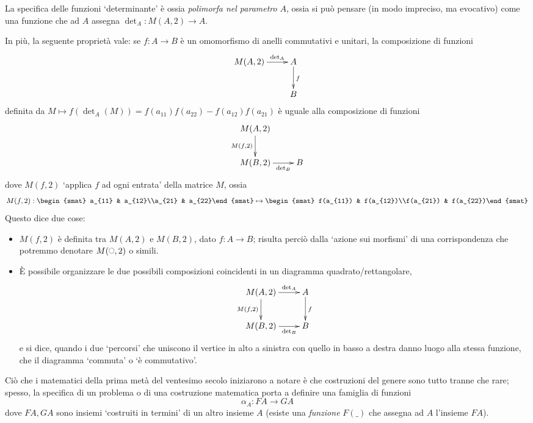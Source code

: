 La specifica delle funzioni `determinante' è ossia \emph{polimorfa nel parametro} \(A\), ossia si può pensare (in modo impreciso, ma evocativo) come una funzione che ad \(A\) assegna  \(\det_A : M(A,2) \to A\).

In più, la seguente proprietà vale: se \(f : A\to B\) è un omomorfismo di anelli commutativi e unitari, la composizione di funzioni
\[\xymatrix{
	M(A,2) \ar[r]^-{\det_A}& A\ar[d]^f \\
	& B
	}\]
definita da \(M\mapsto f(\det_A(M)) = f(a_{11})f(a_{22})-f(a_{12})f(a_{21})\) è uguale alla composizione di funzioni
\[\xymatrix{
	M(A,2) \ar[d]_{M(f,2)}&  \\
	M(B,2) \ar[r]_-{\det_B} & B
	}\] dove \(M(f,2)\) `applica \(f\) ad ogni entrata' della matrice \(M\), ossia
\[M(f,2) : \begin{smat} a_{11} & a_{12}\\a_{21} & a_{22}\end{smat} \mapsto \begin{smat} f(a_{11}) & f(a_{12})\\f(a_{21}) & f(a_{22})\end{smat}\]
Questo dice due cose:
\begin{itemize}
	\item \(M(f,2)\) è definita tra $M(A,2)$ e $M(B,2)$, dato $f : A \to B$; risulta perciò dalla `azione sui morfismi' di una corrispondenza che potremmo denotare $M(\blank,2)$ o simili.
	\item \`E possibile organizzare le due possibili composizioni coincidenti in un diagramma quadrato/rettangolare,
	      \[\xymatrix{
		      M(A,2) \ar[d]_{M(f,2)}\ar[r]^-{\det_A}& A\ar[d]^f \\
		      M(B,2) \ar[r]_-{\det_B} & B
		      }\]
	      e si dice, quando i due `percorsi' che uniscono il vertice in alto a sinistra con quello in basso a destra danno luogo alla stessa funzione, che il diagramma `commuta' o `è commutativo'.
\end{itemize}
Ciò che i matematici della prima metà del ventesimo secolo iniziarono a notare è che costruzioni del genere sono tutto tranne che rare; spesso, la specifica di un problema o di una costruzione matematica porta a definire una famiglia di funzioni
\[\alpha_A : FA \to GA \]
dove \(FA,GA\) sono insiemi `costruiti in termini' di un altro insieme \(A\) (esiste una \emph{funzione} \(F(\_)\) che assegna ad \(A\) l'insieme \(FA\)).

